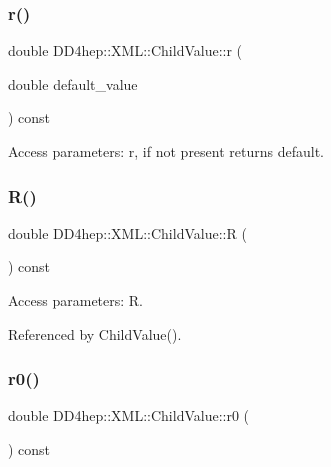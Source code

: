 \subsubsection{\texorpdfstring{r()}{r()}\hspace{0.1cm}{\footnotesize\ttfamily [2/2]}}
{\footnotesize\ttfamily double D\+D4hep\+::\+X\+M\+L\+::\+Child\+Value\+::r (\begin{DoxyParamCaption}\item[{double}]{default\+\_\+value }\end{DoxyParamCaption}) const}



Access parameters\+: r, if not present returns default. 

\hypertarget{struct_d_d4hep_1_1_x_m_l_1_1_child_value_afcdfbd67a48dd6d9bdcd39da24d14eb9}{}\label{struct_d_d4hep_1_1_x_m_l_1_1_child_value_afcdfbd67a48dd6d9bdcd39da24d14eb9} 
\subsubsection{\texorpdfstring{R()}{R()}}
{\footnotesize\ttfamily double D\+D4hep\+::\+X\+M\+L\+::\+Child\+Value\+::R (\begin{DoxyParamCaption}{ }\end{DoxyParamCaption}) const}



Access parameters\+: R. 



Referenced by Child\+Value().

\hypertarget{struct_d_d4hep_1_1_x_m_l_1_1_child_value_aacb961da9e78c96be5621540abc43c87}{}\label{struct_d_d4hep_1_1_x_m_l_1_1_child_value_aacb961da9e78c96be5621540abc43c87} 
\subsubsection{\texorpdfstring{r0()}{r0()}}
{\footnotesize\ttfamily double D\+D4hep\+::\+X\+M\+L\+::\+Child\+Value\+::r0 (\begin{DoxyParamCaption}{ }\end{DoxyParamCaption}) const}



